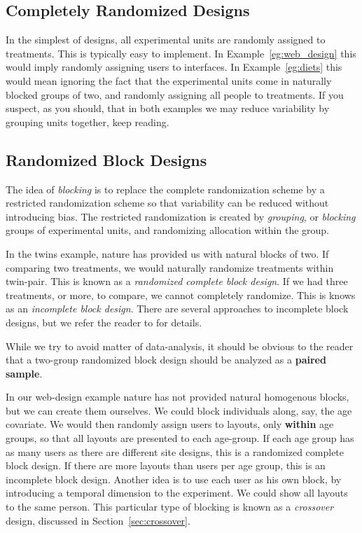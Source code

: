 \subsection{Completely Randomized Designs}
In the simplest of designs, all experimental units are randomly assigned to treatments. 
This is typically easy to implement.
In Example~\ref{eg:web_design} this would imply randomly assigning users to interfaces.
In Example~\ref{eg:diets} this would mean ignoring the fact that the experimental units come in naturally blocked groups of two, and randomly assigning all people to treatments. 
If you suspect, as you should, that in both examples we may reduce variability by grouping units together, keep reading.






\subsection{Randomized Block Designs}
The idea of \emph{blocking} is to replace the complete randomization scheme by a restricted randomization scheme so that variability can be reduced without introducing bias. 
The restricted randomization is created by \emph{grouping}, or \emph{blocking} groups of experimental units, and randomizing allocation within the group. 

In the twins example, nature has provided us with natural blocks of two. 
If comparing two treatments, we would naturally randomize treatments within twin-pair. 
This is known as a \emph{randomized complete block design}. 
If we had three treatments, or more, to compare, we cannot completely randomize. This is knows as an \emph{incomplete block design}. 
There are several approaches to incomplete block designs, but we refer the reader to \cite[Sec.4.2]{cox_theory_2000} for details.

\begin{remark}
While we try to avoid matter of data-analysis, it should be obvious to the reader that a two-group randomized block design should be analyzed as a \textbf{paired sample}. 
\end{remark}

In our web-design example nature has not provided natural homogenous blocks, but we can create them ourselves. 
We could block individuals along, say, the age covariate. 
We would then randomly assign users to layouts, only \textbf{within} age groups, so that all layouts are presented to each age-group. 
If each age group has as many users as there are different site designs, this is a randomized complete block design. 
If there are more layouts than users per age group, this is an incomplete block design. 
Another idea is to use each user as his own block, by introducing a temporal dimension to the experiment.
We could show all layouts to the same person. 
This particular type of blocking is known as a \emph{crossover} design, discussed in Section~\ref{sec:crossover}.

